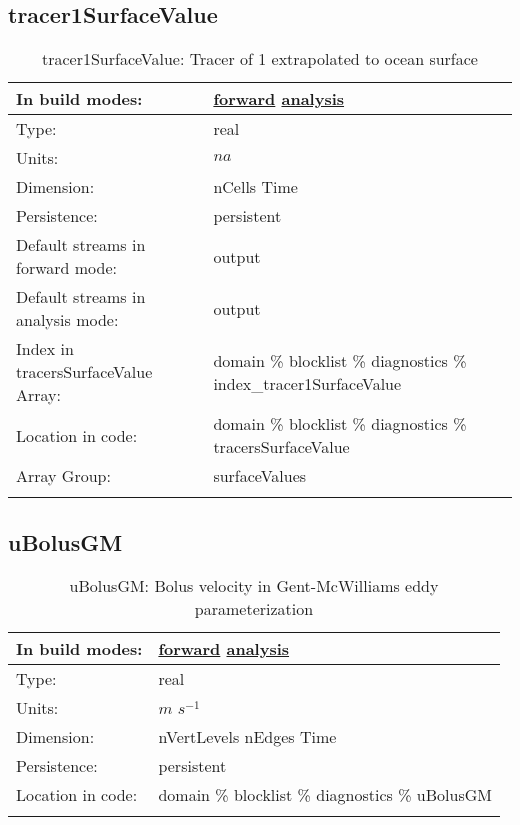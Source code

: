 \subsection[tracer1SurfaceValue]{tracer1SurfaceValue}
\label{subsec:var_sec_diagnostics_tracer1SurfaceValue}
\begin{center}
\begin{longtable}{| p{2.0in} | p{4.0in} |}
        \hline 
        In build modes: & \hyperref[subsec:forward_var_tab_diagnostics]{forward} \hyperref[subsec:analysis_var_tab_diagnostics]{analysis} \\
        \hline 
        Type: & real \\
        \hline 
        Units: & $na$ \\
        \hline 
        Dimension: & nCells Time \\
        \hline 
        Persistence: & persistent \\
        \hline 
		 Default streams in forward mode: &  output \\
        \hline 
		 Default streams in analysis mode: &  output \\
        \hline 
		 Index in tracersSurfaceValue Array: & domain \% blocklist \% diagnostics \% index\_tracer1SurfaceValue \\
		 \hline 
		 Location in code: & domain \% blocklist \% diagnostics \% tracersSurfaceValue \\
		 \hline 
		 Array Group: & surfaceValues \\
		 \hline 
    \caption{tracer1SurfaceValue: Tracer of 1 extrapolated to ocean surface}
\end{longtable}
\end{center}
\subsection[uBolusGM]{uBolusGM}
\label{subsec:var_sec_diagnostics_uBolusGM}
\begin{center}
\begin{longtable}{| p{2.0in} | p{4.0in} |}
        \hline 
        In build modes: & \hyperref[subsec:forward_var_tab_diagnostics]{forward} \hyperref[subsec:analysis_var_tab_diagnostics]{analysis} \\
        \hline 
        Type: & real \\
        \hline 
        Units: & $m$ $s^{-1}$ \\
        \hline 
        Dimension: & nVertLevels nEdges Time \\
        \hline 
        Persistence: & persistent \\
        \hline 
		 Location in code: & domain \% blocklist \% diagnostics \% uBolusGM \\
		 \hline 
    \caption{uBolusGM: Bolus velocity in Gent-McWilliams eddy parameterization}
\end{longtable}
\end{center}
